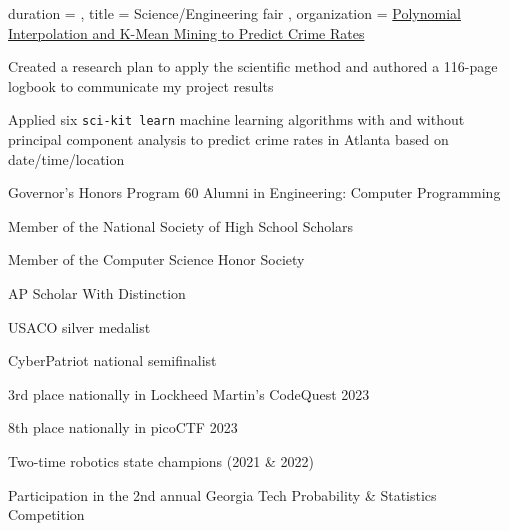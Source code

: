 \documentclass[sidebar-width=2.25in, primary=slate]{clean-resume}
\begin{document}
    \begin{experience}
      {
        duration = {  },
        title = { Science/Engineering fair },
        organization = { \href{https://github.com/anishgoyal1108/Polynomial-Interpolation-and-K-Means-Crime-Prediction-Project}{Polynomial Interpolation and K-Mean Mining to Predict Crime Rates\phantom{aaaaaaaaaaaa}} }
      }
      \item Created a research plan to apply the scientific method and authored a 116-page logbook to communicate my project results
      \item Applied six \verb|sci-kit learn| machine learning algorithms with and without principal component analysis to predict crime rates in Atlanta based on date/time/location
    \end{experience}

    
    \begin{lst}
      \item Governor's Honors 
      Program 60 Alumni in Engineering: Computer Programming
      \item Member of the National Society of High School Scholars
      \item Member of the Computer Science Honor Society
      \item AP Scholar With  Distinction
      \item USACO silver medalist
      \item CyberPatriot national semifinalist
      \item 3rd place nationally in Lockheed Martin's CodeQuest 2023
      \item 8th place nationally in picoCTF 2023
      \item Two-time robotics state champions (2021 \& 2022)
      \item Participation in the 2nd annual Georgia Tech Probability \& Statistics Competition
    \end{lst}
\end{document}
